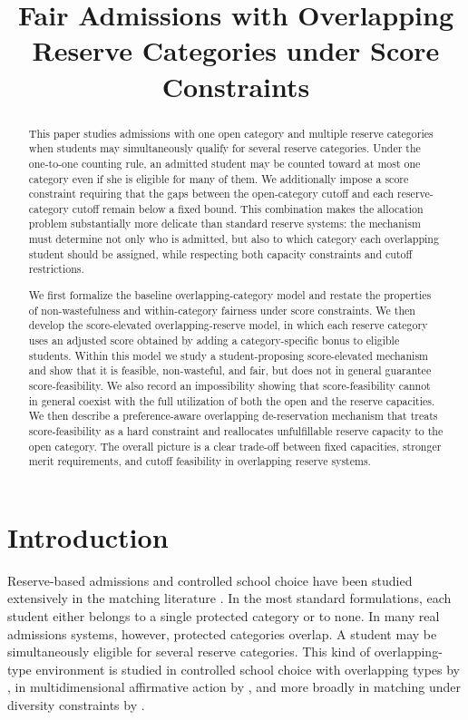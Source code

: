 \documentclass[runningheads]{llncs}
\title{Fair Admissions with Overlapping Reserve Categories under Score Constraints}
\author{}
\institute{}
\newcommand{\1}{\mathbf{1}}
\begin{document}
\maketitle

\begin{abstract}
This paper studies admissions with one open category and multiple reserve categories when students may simultaneously qualify for several reserve categories. Under the one-to-one counting rule, an admitted student may be counted toward at most one category even if she is eligible for many of them. We additionally impose a score constraint requiring that the gaps between the open-category cutoff and each reserve-category cutoff remain below a fixed bound. This combination makes the allocation problem substantially more delicate than standard reserve systems: the mechanism must determine not only who is admitted, but also to which category each overlapping student should be assigned, while respecting both capacity constraints and cutoff restrictions.

We first formalize the baseline overlapping-category model and restate the properties of non-wastefulness and within-category fairness under score constraints. We then develop the score-elevated overlapping-reserve model, in which each reserve category uses an adjusted score obtained by adding a category-specific bonus to eligible students. Within this model we study a student-proposing score-elevated mechanism and show that it is feasible, non-wasteful, and fair, but does not in general guarantee score-feasibility. We also record an impossibility showing that score-feasibility cannot in general coexist with the full utilization of both the open and the reserve capacities. We then describe a preference-aware overlapping de-reservation mechanism that treats score-feasibility as a hard constraint and reallocates unfulfillable reserve capacity to the open category. The overall picture is a clear trade-off between fixed capacities, stronger merit requirements, and cutoff feasibility in overlapping reserve systems.
\end{abstract}

\section{Introduction}
Reserve-based admissions and controlled school choice have been studied extensively in the matching literature \cite{Abdu05a,EHYY14a,AyTu20a,AyTu23a}. In the most standard formulations, each student either belongs to a single protected category or to none. In many real admissions systems, however, protected categories overlap. A student may be simultaneously eligible for several reserve categories. This kind of overlapping-type environment is studied in controlled school choice with overlapping types by \cite{KHIY17a}, in multidimensional affirmative action by \cite{AyBo21a}, and more broadly in matching under diversity constraints by \cite{GKK+17a}.
\end{document}
